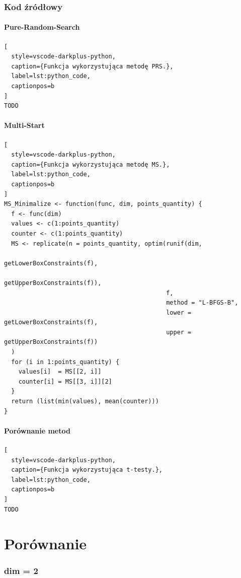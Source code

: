 \documentclass{lab}
\begin{document}
\section{Kod źródłowy}
\subsection{Pure-Random-Search}
\begin{lstlisting}[
  style=vscode-darkplus-python,
  caption={Funkcja wykorzystująca metodę PRS.},
  label=lst:python_code,
  captionpos=b
]
TODO
\end{lstlisting}

\subsection{Multi-Start}
\begin{lstlisting}[
  style=vscode-darkplus-python,
  caption={Funkcja wykorzystująca metodę MS.},
  label=lst:python_code,
  captionpos=b
]
MS_Minimalize <- function(func, dim, points_quantity) {
  f <- func(dim)
  values <- c(1:points_quantity)
  counter <- c(1:points_quantity) 
  MS <- replicate(n = points_quantity, optim(runif(dim, 
                                                   getLowerBoxConstraints(f), 
                                                   getUpperBoxConstraints(f)), 
                                             f, 
                                             method = "L-BFGS-B",
                                             lower = getLowerBoxConstraints(f), 
                                             upper = getUpperBoxConstraints(f))
  )
  for (i in 1:points_quantity) {
    values[i]  = MS[[2, i]]
    counter[i] = MS[[3, i]][2] 
  }
  return (list(min(values), mean(counter)))
}
\end{lstlisting}

\subsection{Porównanie metod}
\begin{lstlisting}[
  style=vscode-darkplus-python,
  caption={Funkcja wykorzystująca t-testy.},
  label=lst:python_code,
  captionpos=b
]
TODO
\end{lstlisting}

\newpage
\part{Porównanie}
\section{dim = 2}
\end{document}
